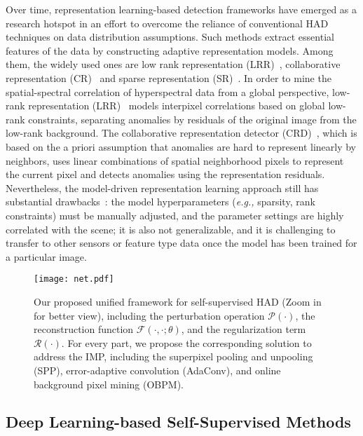Over time, representation learning-based detection frameworks have emerged as a research hotspot in an effort to overcome the reliance of conventional HAD techniques on data distribution assumptions. Such methods extract essential features of the data by constructing adaptive representation models. Among them, the widely used ones are low rank representation (LRR)~\cite{gao2021using,zhuang2021hyperspectral,zhuang2020hyperspectral,yin2015laplacian}, collaborative representation (CR)~\cite{zhao2022hyperspectral} and sparse representation (SR)~\cite{zhuang2021fasthymix,li2020lowrank,zhuang2023crosstrack,du_beyond_2016}. In order to mine the spatial-spectral correlation of hyperspectral data from a global perspective, low-rank representation (LRR)~\cite{liu2010robust} models interpixel correlations based on global low-rank constraints, separating anomalies by residuals of the original image from the low-rank background. The collaborative representation detector (CRD)~\cite{zhang2014hyperspectral}, which is based on the a priori assumption that anomalies are hard to represent linearly by neighbors, uses linear combinations of spatial neighborhood pixels to represent the current pixel and detects anomalies using the representation residuals. Nevertheless, the model-driven representation learning approach still has substantial drawbacks~\cite{bioucas2013hyperspectral}: the model hyperparameters (\textit{e.g.,} sparsity, rank constraints) must be manually adjusted, and the parameter settings are highly correlated with the scene; it is also not generalizable, and it is challenging to transfer to other sensors or feature type data once the model has been trained for a particular image.

\begin{figure*}[htbp]
    \centering\texttt{[image: net.pdf]}
    \caption{Our proposed unified framework for self-supervised HAD (Zoom in for better view), including the perturbation operation $\mathcal{P}(\cdot)$, the reconstruction function $\mathcal{F}(\cdot,\cdot;\theta)$, and the regularization term $\mathcal{R}(\cdot)$. For every part, we propose the corresponding solution to address the IMP, including the superpixel pooling and unpooling (SPP), error-adaptive convolution (AdaConv), and online background pixel mining (OBPM).} \label{fig:net}
  \end{figure*}

\subsection{Deep Learning-based Self-Supervised Methods}

